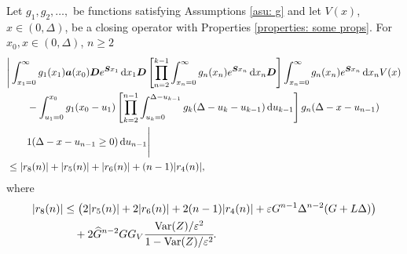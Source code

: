 \begin{cor} \label{cor: aaaaa}
	Let \(g_1,g_2,\dots,\) be functions satisfying Assumptions \ref{asu: g} and let \(V(x)\), \(x\in(0,\Delta)\), be a closing operator with Properties \ref{properties: some props}. For \(x_0,x\in(0,\Delta)\), \(n\geq 2\)
	\begin{align}
		&\Bigg| \int_{x_1=0}^\infty g_1(x_1) \boldsymbol a (x_0) \boldsymbol D e^{\boldsymbol{S}x_1}\, \mathrm{d} x_1\boldsymbol D 
            	\left[\prod_{n=2}^{k-1}\int_{x_n=0}^\infty g_n(x_n) e^{\boldsymbol{S}x_n} \, \mathrm{d} x_n
		\boldsymbol D\right]
            	\int_{x_n=0}^\infty g_{n}(x_n) e^{\boldsymbol{S}x_n} \, \mathrm{d} x_n V(x) \nonumber 
		\\&\qquad {}- \int_{u_1=0}^{x_0}g_1(x_0 - u_1)
		\left[\prod_{k=2}^{n-1} \int_{u_k=0}^{\Delta-u_{k-1}} g_k(\Delta-u_k-u_{k-1})\, \mathrm{d} u_{k-1}\right] \nonumber 
            	g_{n}(\Delta - x-u_{n-1})
	\\&\qquad{} 1(\Delta-x-u_{n-1}\geq0)\, \mathrm{d} u_{n-1} \Bigg| \nonumber
		\\&\leq |r_8(n)|+|r_5(n)|+|r_6(n)| + (n-1)|r_4(n)|,\label{eqn: KAFnn}
	\end{align}
	where 
	\begin{align}
		|r_8(n)|&\leq \left( 2|r_5(n)| + 2|r_6(n)| + 2(n-1)|r_4(n)| + \varepsilon G^{n-1}\Delta^{n-2}(G+L\Delta) \right) \\&\quad{} 
	+2\widehat G^{n-2}GG_V\cfrac{\mathrm{Var}(Z)/\varepsilon^2}{1-\mathrm{Var}(Z)/\varepsilon^2}.
	\end{align}
\end{cor}
